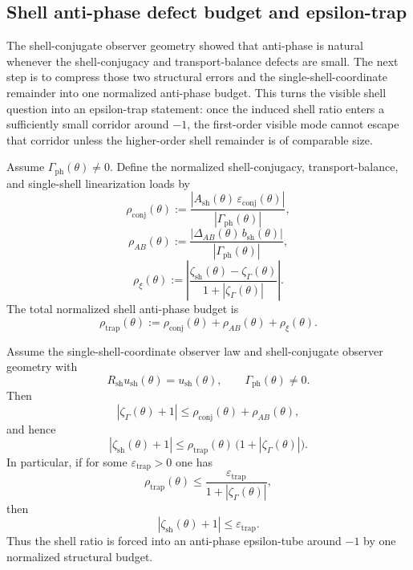 \subsection*{Shell anti-phase defect budget and epsilon-trap}
The shell-conjugate observer geometry showed that anti-phase is natural whenever the shell-conjugacy and transport-balance defects are small. The next step is to compress those two structural errors and the single-shell-coordinate remainder into one normalized anti-phase budget. This turns the visible shell question into an epsilon-trap statement: once the induced shell ratio enters a sufficiently small corridor around $-1$, the first-order visible mode cannot escape that corridor unless the higher-order shell remainder is of comparable size.

\begin{definition}
Assume $\Gamma_{\mathrm{ph}}(\theta)\neq 0$. Define the normalized shell-conjugacy, transport-balance, and single-shell linearization loads by
\[
  \rho_{\mathrm{conj}}(\theta)
  :=
  \frac{|A_{\mathrm{sh}}(\theta)\,\varepsilon_{\mathrm{conj}}(\theta)|}{|\Gamma_{\mathrm{ph}}(\theta)|},
\]
\[
  \rho_{AB}(\theta)
  :=
  \frac{|\Delta_{AB}(\theta)\,b_{\mathrm{sh}}(\theta)|}{|\Gamma_{\mathrm{ph}}(\theta)|},
\]
\[
  \rho_{\xi}(\theta)
  :=
  \left|\frac{\zeta_{\mathrm{sh}}(\theta)-\zeta_{\Gamma}(\theta)}{1+|\zeta_{\Gamma}(\theta)|}\right|.
\]
The total normalized shell anti-phase budget is
\[
  \rho_{\mathrm{trap}}(\theta)
  :=
  \rho_{\mathrm{conj}}(\theta)+\rho_{AB}(\theta)+\rho_{\xi}(\theta).
\]
\end{definition}

\begin{theorem}
\label{thm:working-shell-anti-phase-epsilon-trap}
Assume the single-shell-coordinate observer law and shell-conjugate observer geometry with
\[
  R_{\mathrm{sh}}u_{\mathrm{sh}}(\theta)=u_{\mathrm{sh}}(\theta),
  \qquad
  \Gamma_{\mathrm{ph}}(\theta)\neq 0.
\]
Then
\[
  |\zeta_{\Gamma}(\theta)+1|
  \le
  \rho_{\mathrm{conj}}(\theta)+\rho_{AB}(\theta),
\]
and hence
\[
  |\zeta_{\mathrm{sh}}(\theta)+1|
  \le
  \rho_{\mathrm{trap}}(\theta)\,\bigl(1+|\zeta_{\Gamma}(\theta)|\bigr).
\]
In particular, if for some $\varepsilon_{\mathrm{trap}}>0$ one has
\[
  \rho_{\mathrm{trap}}(\theta)
  \le
  \frac{\varepsilon_{\mathrm{trap}}}{1+|\zeta_{\Gamma}(\theta)|},
\]
then
\[
  |\zeta_{\mathrm{sh}}(\theta)+1|\le \varepsilon_{\mathrm{trap}}.
\]
Thus the shell ratio is forced into an anti-phase epsilon-tube around $-1$ by one normalized structural budget.
\end{theorem}

